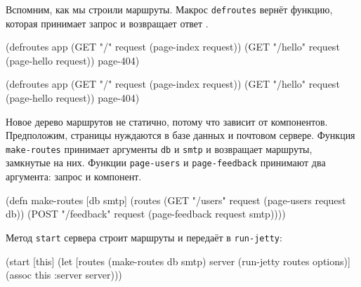 
Вспомним, как мы строили маршруты. Макрос \verb|defroutes| вернёт функцию,
которая принимает запрос и возвращает ответ .

\ifnarrow

\begin{english}
  \begin{clojure}
(defroutes app
  (GET "/"
    request (page-index request))
  (GET "/hello"
    request (page-hello request))
  page-404)
  \end{clojure}
\end{english}

\else

\begin{english}
  \begin{clojure}
(defroutes app
  (GET "/"      request (page-index request))
  (GET "/hello" request (page-hello request))
  page-404)
  \end{clojure}
\end{english}

\fi

Новое дерево маршрутов не статично, потому что зависит от компонентов.
Предположим, страницы нуждаются в базе данных и почтовом сервере.  Функция
\verb|make-routes| принимает аргументы \verb|db| и \verb|smtp| и возвращает
маршруты, замкнутые на них. Функции \verb|page-users| и \verb|page-feedback|
принимают два аргумента: запрос и компонент.

\begin{english}
  \begin{clojure}
(defn make-routes [db smtp]
  (routes
   (GET "/users" request
      (page-users request db))
   (POST "/feedback" request
      (page-feedback request smtp))))
  \end{clojure}
\end{english}

\noindent
Метод \verb|start| сервера строит маршруты и передаёт в \verb|run-jetty|:

\ifnarrow

\begin{english}
  \begin{clojure}
(start [this]
  (let [routes (make-routes db smtp)
        server (run-jetty
                 routes options)]
    (assoc this :server server)))
  \end{clojure}
\end{english}

\else

